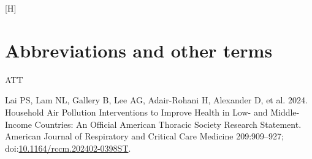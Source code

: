 \documentclass[
  letterpaper,
  DIV=11,
  numbers=noendperiod]{scrartcl}
\makeatletter
\newlength{\cslhangindent}
\newenvironment{CSLReferences}[2] %
 {\begin{list}{}{%
  \setlength{\itemindent}{0pt}
  \setlength{\leftmargin}{0pt}
  \setlength{\parsep}{0pt}
  \ifodd #1
   \setlength{\leftmargin}{\cslhangindent}
   \setlength{\itemindent}{-1\cslhangindent}
  \fi
  \setlength{\itemsep}{#2\baselineskip}}}
 {\end{list}}
\renewenvironment{table}%
   {\renewcommand\familydefault\sfdefault
    \@float{table}}
   {\end@float}
\makeatother
\begin{document}
\begin{table}[H]
{}

\end{table}%

\newpage

\section*{Abbreviations and other
terms}\label{abbreviations-and-other-terms}

ATT

\label{refs}
\begin{CSLReferences}{1}{1}
Lai PS, Lam NL, Gallery B, Lee AG, Adair-Rohani H, Alexander D, et al.
2024. Household {Air Pollution Interventions} to {Improve Health} in
{Low-} and {Middle-Income Countries}: {An Official American Thoracic
Society Research Statement}. American Journal of Respiratory and
Critical Care Medicine 209:909--927;
doi:\href{https://doi.org/10.1164/rccm.202402-0398ST}{10.1164/rccm.202402-0398ST}.

\end{CSLReferences}
\end{document}
